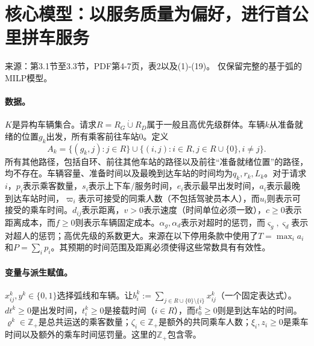 \documentclass[11pt]{article}
\begin{document}
\section*{核心模型：以服务质量为偏好，进行首公里拼车服务}
来源：第3.1节至3.3节，PDF第4-7页，表2以及(1)-(19)。  
仅保留完整的基于弧的MILP模型。
\paragraph{数据。}
$K$是异构车辆集合。请求$R=R_G\mathbin{\dot\cup}R_D$属于一般且高优先级群体。车辆$k$从准备就绪的位置$g_k$出发，所有乘客前往车站$0$。定义
\[
 A_k=\{(g_k,j):j\in R\}\cup
 \{(i,j):i\in R,j\in R\cup\{0\},i\ne j\}.
\]
所有其他路径，包括自环、前往其他车站的路径以及前往“准备就绪位置”的路径，均不存在。车辆容量、准备时间以及最晚到达车站的时间均为$q_k,r_k,L_k$。对于请求$i$，$p_i$表示乘客数量，$s_i$表示上下车/服务时间，$e_i$表示最早出发时间，$a_i$表示最晚到达车站时间，$\varpi_i$表示可接受的同乘人数（不包括驾驶员本人），而$u_i$则表示可接受的乘车时间。$d_{ij}$表示距离，$v>0$表示速度（时间单位必须一致），$c\ge0$表示距离成本，而$f\ge0$则表示车辆固定成本。$\alpha_g,\alpha_d$表示对超时的惩罚，而$\varsigma_g,\varsigma_d$表示对超人的惩罚；高优先级的系数更大。来源在以下停用条款中使用了$T=\max_i a_i$和$P=\sum_i p_i$。其预期的时间范围及距离必须使得这些常数具有有效性。
\paragraph{变量与派生赋值。}
$x^k_{ij},y^k\in\{0,1\}$选择弧线和车辆。让$b_i^k:=\sum_{j\in R\cup\{0\}\setminus\{i\}}x^k_{ij}$（一个固定表达式）。$dt^k\ge0$是出发时间，$t_i^k\ge0$是接载时间（$i\in R$），而$t_0^k\ge0$则是到达车站的时间。$\varrho^k\in\mathbb Z_+$是总共运送的乘客数量；$\zeta_i\in\mathbb Z_+$是额外的共同乘车人数；$\xi_i,z_i\ge0$是乘车时间以及额外的乘车时间惩罚量。这里的$\mathbb Z_+$包含零。
\end{document}
